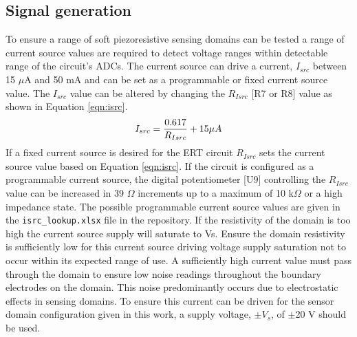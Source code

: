 \subsection{Signal generation}
To ensure a range of soft piezoresistive sensing domains can be tested a range of current source values are required to detect voltage ranges within detectable range of the circuit's ADCs. The current source can drive a current, $I_{src}$ between 15 $\mu$A and 50 mA and can be set as a programmable or fixed current source value. The $I_{src}$ value can be altered by changing the $R_{Isrc}$ [R7 or R8] value as shown in Equation \ref{eqn:isrc}.
\begin{equation}
I_{src} = \frac{0.617}{R_{Isrc}} + 15 \space \mu A
\label{eqn:isrc}
\end{equation}
If a fixed current source is desired for the ERT circuit $R_{Isrc}$ sets the current source value based on Equation \ref{eqn:isrc}. If the circuit is configured as a programmable current source, the digital potentiometer [U9] controlling the $R_{Isrc}$ value can be increased in 39 $\Omega$ increments up to a maximum of 10 k$\Omega$ or a high impedance state. The possible programmable current source values are given in the \verb|isrc_lookup.xlsx| file in the repository. If the resistivity of the domain is too high the current source supply will saturate to Vs. Ensure the domain resistivity is sufficiently low for this current source driving voltage supply saturation not to occur within its expected range of use. 
A sufficiently high current value must pass through the domain to ensure low noise readings throughout the boundary electrodes on the domain. This noise predominantly occurs due to electrostatic effects in sensing domains. To ensure this current can be driven for the sensor domain configuration given in this work, a supply voltage, $\pm V_s$, of $\pm$20 V should be used.


